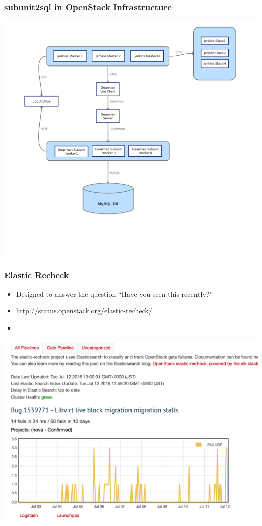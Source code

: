 \documentclass[aspectratio=43,11pt,hyperref={colorlinks=true}]{beamer}
\begin{document}
\begin{frame}
    \frametitle{subunit2sql in OpenStack Infrastructure}
    \begin{center}
        \includegraphics[height=1.0\textheight]{subunit2sql-collection.png}
    \end{center}
\end{frame}

\begin{frame}
  \frametitle{Elastic Recheck}
  \begin{itemize}
    \item Designed to answer the question ``Have you seen this recently?''
    \item \href{http://status.openstack.org/elastic-recheck/}{http://status.openstack.org/elastic-recheck/}
    \item
  \end{itemize}
  \begin{center}
    \includegraphics[width=.9\textwidth]{elastic-recheck-sample.png}
  \end{center}
\end{frame}
\end{document}
